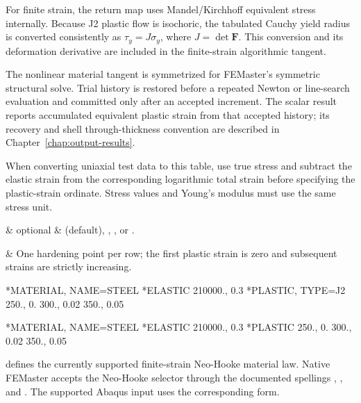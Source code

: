 For finite strain, the return map uses Mandel/Kirchhoff equivalent stress internally. Because J2 plastic flow is isochoric, the tabulated Cauchy yield radius is converted consistently as \(\tau_y=J\sigma_y\), where \(J=\det\mathbf F\). This conversion and its deformation derivative are included in the finite-strain algorithmic tangent.

The nonlinear material tangent is symmetrized for FEMaster's symmetric structural solve. Trial history is restored before a repeated Newton or line-search evaluation and committed only after an accepted increment. The scalar result  reports accumulated equivalent plastic strain from that accepted history; its recovery and shell through-thickness convention are described in Chapter~\ref{chap:output-results}.

When converting uniaxial test data to this table, use true stress and subtract the elastic strain from the corresponding logarithmic total strain before specifying the plastic-strain ordinate. Stress values and Young's modulus must use the same stress unit.

\begin{keywordparameters}
 & optional &  (default), , , or . \\
\end{keywordparameters}

\begin{keyworddata}
 & One hardening point per row; the first plastic strain is zero and subsequent strains are strictly increasing. \\
\end{keyworddata}

\exampleheading

\begin{dialectexamples}
\begin{femasterdeck}
*MATERIAL, NAME=STEEL
*ELASTIC
210000., 0.3
*PLASTIC, TYPE=J2
250., 0.
300., 0.02
350., 0.05
\end{femasterdeck}
\begin{abaqusdeck}
*MATERIAL, NAME=STEEL
*ELASTIC
210000., 0.3
*PLASTIC
250., 0.
300., 0.02
350., 0.05
\end{abaqusdeck}
\end{dialectexamples}


 defines the currently supported finite-strain Neo-Hooke material law. Native FEMaster accepts the Neo-Hooke selector through the documented spellings , , and . The supported Abaqus input uses the corresponding  form.

